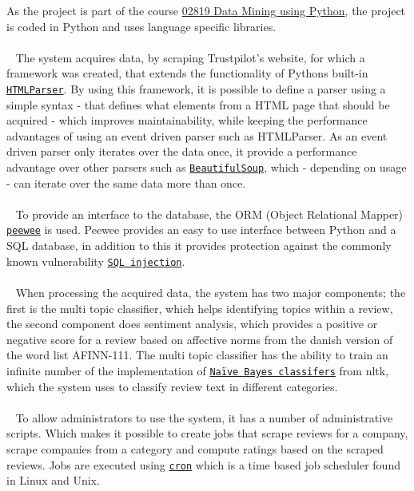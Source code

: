 \documentclass[10pt]{IEEEtran}
\begin{document}
As the project is part of the course \href{http://www.kurser.dtu.dk/02819.aspx?menulanguage=en-GB}{02819 Data Mining using Python}, the project is coded in Python and uses language specific libraries.
\\~
\\~
The system acquires data, by scraping Trustpilot's website, for which a framework was created, that extends the functionality of Pythons built-in \href{http://docs.python.org/2/library/htmlparser.html}{\texttt{HTMLParser}}. By using this framework, it is possible to define a parser using a simple syntax - that defines what elements from a HTML page that should be acquired - which improves maintainability, while keeping the performance advantages of using an event driven parser such as HTMLParser. \newline As an event driven parser only iterates over the data once, it provide a performance advantage over other parsers such as \href{http://www.crummy.com/software/BeautifulSoup/}{\texttt{BeautifulSoup}}, which - depending on usage - can iterate over the same data more than once.
\\~
\\~
To provide an interface to the database, the ORM (Object Relational Mapper) \href{http://peewee.readthedocs.org/en/latest/}{\texttt{peewee}} is used. Peewee provides an easy to use interface between Python and a SQL database, in addition to this it provides protection against the commonly known vulnerability \href{https://www.owasp.org/index.php/Top_10_2013-A1-Injection}{\texttt{SQL injection}}.
\\~
\\~
When processing the acquired data, the system has two major components; the first is the multi topic classifier, which helps identifying topics within a review, the second component does sentiment analysis, which provides a positive or negative score for a review based on affective norms from the danish version of the word list AFINN-111\cite{IMM2011-06010}. The multi topic classifier has the ability to train an infinite number of the implementation of \href{http://nltk.org/api/nltk.classify.html#module-nltk.classify.naivebayes}{\texttt{Naïve Bayes classifers}} from nltk, which the system uses to classify review text in different categories.
\\~
\\~
To allow administrators to use the system, it has a number of administrative scripts. Which makes it possible to create jobs that scrape reviews for a company, scrape companies from a category and compute ratings based on the scraped reviews. Jobs are executed using \href{http://pubs.opengroup.org/onlinepubs/009696699/utilities/crontab.html}{\texttt{cron}} which is a time based job scheduler found in Linux and Unix.
\end{document}
